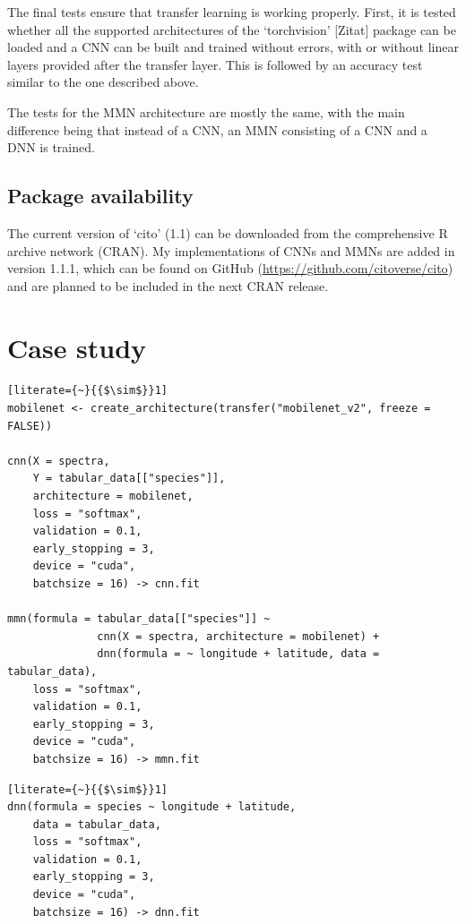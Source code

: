 \documentclass[12pt,twoside]{scrreport}
\newcommand{\pkg}[1]{`#1'}
\begin{document}
The final tests ensure that transfer learning is working properly. First, it is tested whether all the supported architectures of the \pkg{torchvision} [Zitat] package can be loaded and a CNN can be built and trained without errors, with or without linear layers provided after the transfer layer. This is followed by an accuracy test similar to the one described above.

The tests for the MMN architecture are mostly the same, with the main difference being that instead of a CNN, an MMN consisting of a CNN and a DNN is trained.

\section*{Package availability}
The current version of \pkg{cito} (1.1) can be downloaded from the comprehensive R archive network (CRAN). My implementations of CNNs and MMNs are added in version 1.1.1, which can be found on GitHub (\url{https://github.com/citoverse/cito}) and are planned to be included in the next CRAN release.

\chapter*{Case study}
\newsavebox{\cnn} %
\begin{lrbox}{\cnn}
	\begin{lstlisting}[literate={~}{{$\sim$}}1]
mobilenet <- create_architecture(transfer("mobilenet_v2", freeze = FALSE))

cnn(X = spectra,
    Y = tabular_data[["species"]],
    architecture = mobilenet,
    loss = "softmax",
    validation = 0.1,
    early_stopping = 3,
    device = "cuda",
    batchsize = 16) -> cnn.fit
		
mmn(formula = tabular_data[["species"]] ~ 
              cnn(X = spectra, architecture = mobilenet) +
              dnn(formula = ~ longitude + latitude, data = tabular_data),
    loss = "softmax",
    validation = 0.1,
    early_stopping = 3,
    device = "cuda",
    batchsize = 16) -> mmn.fit
	\end{lstlisting}
\end{lrbox}

\newsavebox{\dnn} %
\begin{lrbox}{\dnn}
	\begin{minipage}{\wd\cnn}
		\begin{lstlisting}[literate={~}{{$\sim$}}1]
dnn(formula = species ~ longitude + latitude,                             
    data = tabular_data,
    loss = "softmax",
    validation = 0.1,
    early_stopping = 3,
    device = "cuda",
    batchsize = 16) -> dnn.fit
		\end{lstlisting}
	\end{minipage}
\end{lrbox}
\end{document}
